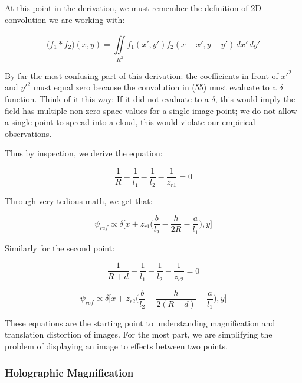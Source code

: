 \documentclass[12pt]{article}
\begin{document}
At this point in the derivation, we must remember the definition of 2D convolution we are working with:

\begin{equation}
	\big(f_{1}*f_{2}\big)(x,y) = \iint \limits_{R^2}^{} f_{1}(x',y')f_{2}(x - x',y - y') \,dx'\,dy'
\end{equation}

By far the most confusing part of this derivation: the coefficients in front of \(x'^2\) and \(y'^2\) must equal zero because the convolution in (55) must evaluate to a \(\delta\) function.
Think of it this way: If it did not evaluate to a \(\delta\), this would imply the field has multiple non-zero space values for a single image point; we do not allow a single point
to spread into a cloud, this would violate our empirical observations.

Thus by inspection, we derive the equation:

\begin{equation}
	\frac{1}{R} - \frac{1}{l_{1}} - \frac{1}{l_{2}} - \frac{1}{z_{r1}} = 0
\end{equation}

Through very tedious math, we get that:

\begin{equation}
	\psi_{ref} \propto \delta \bigg[ x + z_{r1}\bigg(
	\frac{b}{l_{2}} - \frac{h}{2R} - \frac{a}{l_{1}}\bigg),y\bigg]
\end{equation}

Similarly for the second point:

\begin{equation}
	\frac{1}{R + d} - \frac{1}{l_{1}} - \frac{1}{l_{2}} - \frac{1}{z_{r2}} = 0
\end{equation}

\begin{equation}
        \psi_{ref} \propto \delta \bigg[ x + z_{r2}\bigg(
        \frac{b}{l_{2}} - \frac{h}{2(R + d)} - \frac{a}{l_{1}}\bigg),y\bigg]
\end{equation}

These equations are the starting point to understanding magnification and translation distortion of images.
For the most part, we are simplifying the problem of displaying an image to
effects between two points.

\subsubsection{Holographic Magnification}
\end{document}
